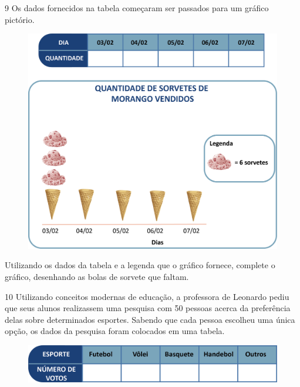 \num{9} Os dados fornecidos na tabela começaram ser passados para um
gráfico pictório.

\begin{figure}[htpb!]
\centering
\includegraphics[width=.7\textwidth]{./media/image84.png}
\end{figure}

\pagebreak

Utilizando os dados da tabela e a legenda que o gráfico fornece,
complete o gráfico, desenhando as bolas de sorvete que faltam.


\num{10} Utilizando conceitos modernas de educação, a professora de Leonardo
pediu que seus alunos realizassem uma pesquisa com 50 pessoas acerca da
preferência delas sobre determinados esportes. Sabendo que cada pessoa
escolheu uma única opção, os dados da pesquisa foram colocados em uma tabela.

\begin{figure}[htpb!]
\centering
\includegraphics[width=\textwidth]{./media/image85.png}
\end{figure}

